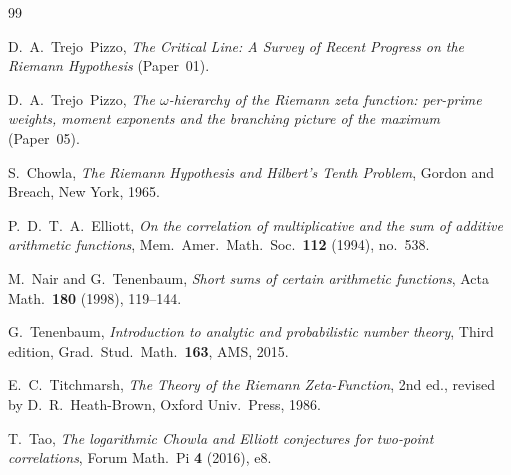 \documentclass[11pt]{amsart}
\theoremstyle{definition}
\theoremstyle{remark}
\newcommand{\om}{\omega}
\begin{document}
\begin{thebibliography}{99}

D.~A.\ Trejo~Pizzo,
\emph{The Critical Line: A Survey of Recent Progress on the Riemann Hypothesis}
(Paper~01).

D.~A.\ Trejo~Pizzo,
\emph{The $\om$-hierarchy of the Riemann zeta function: per-prime weights, moment exponents
and the branching picture of the maximum} (Paper~05).

S.~Chowla,
\emph{The Riemann Hypothesis and Hilbert's Tenth Problem},
Gordon and Breach, New York, 1965.

P.~D.~T.~A.\ Elliott,
\emph{On the correlation of multiplicative and the sum of additive arithmetic functions},
Mem.\ Amer.\ Math.\ Soc.\ \textbf{112} (1994), no.~538.

M.\ Nair and G.\ Tenenbaum,
\emph{Short sums of certain arithmetic functions},
Acta Math.\ \textbf{180} (1998), 119--144.

G.\ Tenenbaum,
\emph{Introduction to analytic and probabilistic number theory},
Third edition, Grad.\ Stud.\ Math.\ \textbf{163}, AMS, 2015.

E.~C.\ Titchmarsh,
\emph{The Theory of the Riemann Zeta-Function},
2nd ed., revised by D.~R.\ Heath-Brown, Oxford Univ.\ Press, 1986.

T.~Tao,
\emph{The logarithmic Chowla and Elliott conjectures for two-point correlations},
Forum Math.\ Pi \textbf{4} (2016), e8.

\end{thebibliography}
\end{document}

